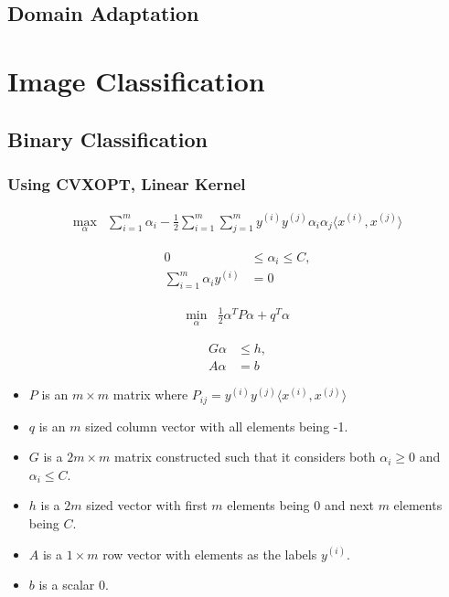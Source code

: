 \documentclass[12pt,a4paper]{article}
\begin{document}
\subsection{Domain Adaptation}

\section{Image Classification}
\subsection{Binary Classification}
\subsubsection{Using CVXOPT, Linear Kernel}

\begin{align*}
\max_{\alpha} & \sum_{i=1}^{m} \alpha_i - \frac{1}{2} \sum_{i=1}^{m} \sum_{j=1}^{m} y^{(i)} y^{(j)} \alpha_i \alpha_j \langle x^{(i)}, x^{(j)} \rangle
\end{align*}


\begin{align*}
0 & \leq \alpha_i \leq C, \\
\sum_{i=1}^{m} \alpha_i y^{(i)} & = 0
\end{align*}


\begin{align*}
\min_{\alpha} & \frac{1}{2} \alpha^T P \alpha + q^T \alpha
\end{align*}


\begin{align*}
G\alpha & \leq h, \\
A\alpha & = b
\end{align*}


\begin{itemize}
\item \( P \) is an \( m \times m \) matrix where \( P_{ij} = y^{(i)} y^{(j)} \langle x^{(i)}, x^{(j)} \rangle \)
\item \( q \) is an \( m \) sized column vector with all elements being -1.
\item \( G \) is a \( 2m \times m \) matrix constructed such that it considers both \( \alpha_i \geq 0 \) and \( \alpha_i \leq C \).
\item \( h \) is a \( 2m \) sized vector with first \( m \) elements being 0 and next \( m \) elements being \( C \).
\item \( A \) is a \( 1 \times m \) row vector with elements as the labels \( y^{(i)} \).
\item \( b \) is a scalar 0.
\end{itemize}
\end{document}
